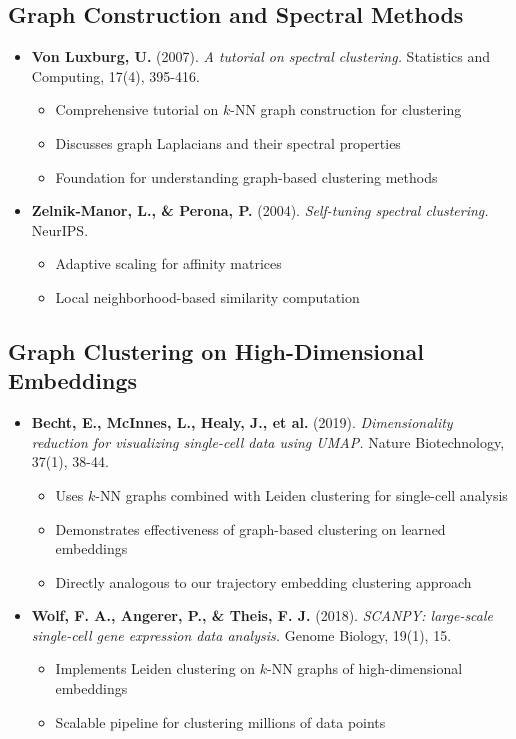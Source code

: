 \documentclass[11pt,a4paper]{article}
\begin{document}
\subsection{Graph Construction and Spectral Methods}

\begin{itemize}[leftmargin=*]
    \item \textbf{Von Luxburg, U.} (2007). \textit{A tutorial on spectral clustering.} Statistics and Computing, 17(4), 395-416.
    \begin{itemize}
        \item Comprehensive tutorial on $k$-NN graph construction for clustering
        \item Discusses graph Laplacians and their spectral properties
        \item Foundation for understanding graph-based clustering methods
    \end{itemize}
    
    \item \textbf{Zelnik-Manor, L., \& Perona, P.} (2004). \textit{Self-tuning spectral clustering.} NeurIPS.
    \begin{itemize}
        \item Adaptive scaling for affinity matrices
        \item Local neighborhood-based similarity computation
    \end{itemize}
\end{itemize}

\subsection{Graph Clustering on High-Dimensional Embeddings}

\begin{itemize}[leftmargin=*]
    \item \textbf{Becht, E., McInnes, L., Healy, J., et al.} (2019). \textit{Dimensionality reduction for visualizing single-cell data using UMAP.} Nature Biotechnology, 37(1), 38-44.
    \begin{itemize}
        \item Uses $k$-NN graphs combined with Leiden clustering for single-cell analysis
        \item Demonstrates effectiveness of graph-based clustering on learned embeddings
        \item Directly analogous to our trajectory embedding clustering approach
    \end{itemize}
    
    \item \textbf{Wolf, F. A., Angerer, P., \& Theis, F. J.} (2018). \textit{SCANPY: large-scale single-cell gene expression data analysis.} Genome Biology, 19(1), 15.
    \begin{itemize}
        \item Implements Leiden clustering on $k$-NN graphs of high-dimensional embeddings
        \item Scalable pipeline for clustering millions of data points
    \end{itemize}
\end{itemize}
\end{document}
